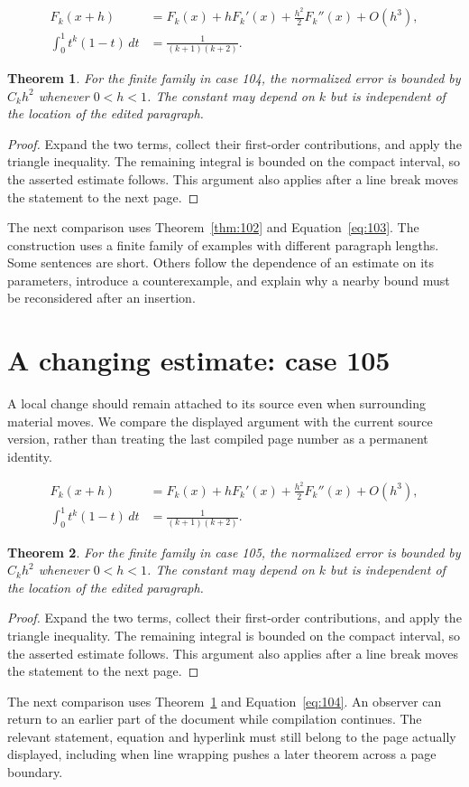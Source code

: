 \documentclass[a4paper,10pt]{article}
\newtheorem{theorem}{Theorem}[section]
\begin{document}
\lipsum[10-11]
\begin{align}\label{eq:103}
 F_k(x+h)&=F_k(x)+hF_k'(x)+\frac{h^2}{2}F_k''(x)+O(h^3),\\
 \int_0^1 t^k(1-t)\,dt&=\frac{1}{(k+1)(k+2)}.
\end{align}
\begin{theorem}\label{thm:103}
For the finite family in case 104, the normalized error is bounded by $C_k h^2$ whenever $0<h<1$. The constant may depend on $k$ but is independent of the location of the edited paragraph.
\end{theorem}
\begin{proof}
Expand the two terms, collect their first-order contributions, and apply the
triangle inequality. The remaining integral is bounded on the compact interval,
so the asserted estimate follows. This argument also applies after a line break
moves the statement to the next page.
\end{proof}
The next comparison uses Theorem~\ref{thm:102} and Equation~\ref{eq:103}. The construction uses a finite family of examples with different paragraph lengths. Some sentences are short. Others follow the dependence of an estimate on its parameters, introduce a counterexample, and explain why a nearby bound must be reconsidered after an insertion.

\lipsum[18]

\section{A changing estimate: case 105}\label{unit:104}
A local change should remain attached to its source even when surrounding material moves. We compare the displayed argument with the current source version, rather than treating the last compiled page number as a permanent identity.

\lipsum[13-14]
\begin{align}\label{eq:104}
 F_k(x+h)&=F_k(x)+hF_k'(x)+\frac{h^2}{2}F_k''(x)+O(h^3),\\
 \int_0^1 t^k(1-t)\,dt&=\frac{1}{(k+1)(k+2)}.
\end{align}
\begin{theorem}\label{thm:104}
For the finite family in case 105, the normalized error is bounded by $C_k h^2$ whenever $0<h<1$. The constant may depend on $k$ but is independent of the location of the edited paragraph.
\end{theorem}
\begin{proof}
Expand the two terms, collect their first-order contributions, and apply the
triangle inequality. The remaining integral is bounded on the compact interval,
so the asserted estimate follows. This argument also applies after a line break
moves the statement to the next page.
\end{proof}
The next comparison uses Theorem~\ref{thm:103} and Equation~\ref{eq:104}. An observer can return to an earlier part of the document while compilation continues. The relevant statement, equation and hyperlink must still belong to the page actually displayed, including when line wrapping pushes a later theorem across a page boundary.
\end{document}
